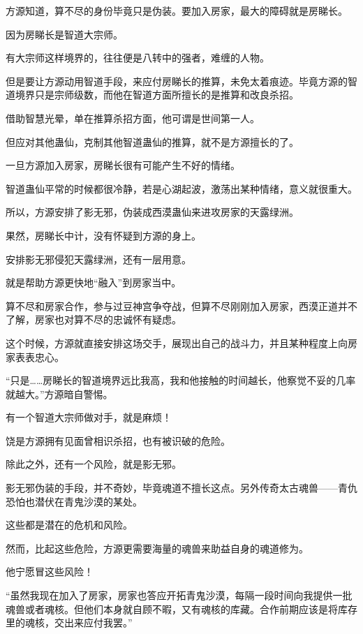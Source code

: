
\begin{this_body}

方源知道，算不尽的身份毕竟只是伪装。要加入房家，最大的障碍就是房睇长。

因为房睇长是智道大宗师。

有大宗师这样境界的，往往便是八转中的强者，难缠的人物。

但是要让方源动用智道手段，来应付房睇长的推算，未免太着痕迹。毕竟方源的智道境界只是宗师级数，而他在智道方面所擅长的是推算和改良杀招。

借助智慧光晕，单在推算杀招方面，他可谓是世间第一人。

但应对其他蛊仙，克制其他智道蛊仙的推算，就不是方源擅长的了。

一旦方源加入房家，房睇长很有可能产生不好的情绪。

智道蛊仙平常的时候都很冷静，若是心湖起波，激荡出某种情绪，意义就很重大。

所以，方源安排了影无邪，伪装成西漠蛊仙来进攻房家的天露绿洲。

果然，房睇长中计，没有怀疑到方源的身上。

安排影无邪侵犯天露绿洲，还有一层用意。

就是帮助方源更快地“融入”到房家当中。

算不尽和房家合作，参与过豆神宫争夺战，但算不尽刚刚加入房家，西漠正道并不了解，房家也对算不尽的忠诚怀有疑虑。

这个时候，方源就直接安排这场交手，展现出自己的战斗力，并且某种程度上向房家表表忠心。

“只是……房睇长的智道境界远比我高，我和他接触的时间越长，他察觉不妥的几率就越大。”方源暗自警惕。

有一个智道大宗师做对手，就是麻烦！

饶是方源拥有见面曾相识杀招，也有被识破的危险。

除此之外，还有一个风险，就是影无邪。

影无邪伪装的手段，并不奇妙，毕竟魂道不擅长这点。另外传奇太古魂兽——青仇恐怕也潜伏在青鬼沙漠的某处。

这些都是潜在的危机和风险。

然而，比起这些危险，方源更需要海量的魂兽来助益自身的魂道修为。

他宁愿冒这些风险！

“虽然我现在加入了房家，房家也答应开拓青鬼沙漠，每隔一段时间向我提供一批魂兽或者魂核。但他们本身就自顾不暇，又有魂核的库藏。合作前期应该是将库存里的魂核，交出来应付我罢。”


\end{this_body}
